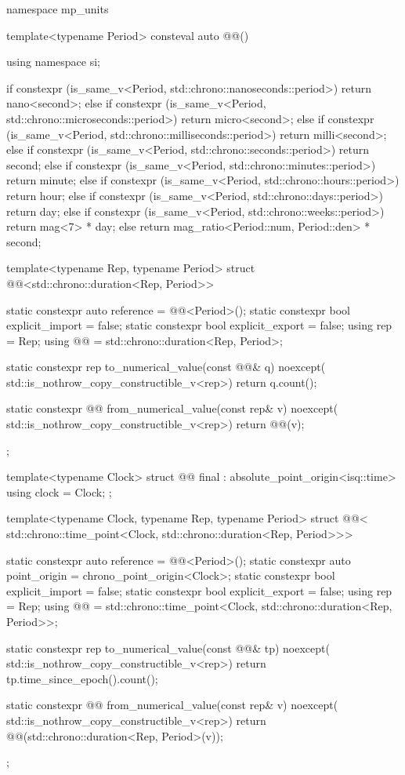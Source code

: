 \begin{codeblock}
namespace mp_units {

template<typename Period>
consteval auto @@()
{
  using namespace si;

  if constexpr (is_same_v<Period, std::chrono::nanoseconds::period>)
    return nano<second>;
  else if constexpr (is_same_v<Period, std::chrono::microseconds::period>)
    return micro<second>;
  else if constexpr (is_same_v<Period, std::chrono::milliseconds::period>)
    return milli<second>;
  else if constexpr (is_same_v<Period, std::chrono::seconds::period>)
    return second;
  else if constexpr (is_same_v<Period, std::chrono::minutes::period>)
    return minute;
  else if constexpr (is_same_v<Period, std::chrono::hours::period>)
    return hour;
  else if constexpr (is_same_v<Period, std::chrono::days::period>)
    return day;
  else if constexpr (is_same_v<Period, std::chrono::weeks::period>)
    return mag<7> * day;
  else
    return mag_ratio<Period::num, Period::den> * second;
}

template<typename Rep, typename Period>
struct @@<std::chrono::duration<Rep, Period>> {
  static constexpr auto reference = @@<Period>();
  static constexpr bool explicit_import = false;
  static constexpr bool explicit_export = false;
  using rep = Rep;
  using @@ = std::chrono::duration<Rep, Period>;

  static constexpr rep to_numerical_value(const @@& q) noexcept(
    std::is_nothrow_copy_constructible_v<rep>)
  {
    return q.count();
  }

  static constexpr @@ from_numerical_value(const rep& v) noexcept(
    std::is_nothrow_copy_constructible_v<rep>)
  {
    return @@(v);
  }
};

template<typename Clock>
struct @@ final : absolute_point_origin<isq::time> {
  using clock = Clock;
};

template<typename Clock, typename Rep, typename Period>
struct @@<
  std::chrono::time_point<Clock, std::chrono::duration<Rep, Period>>> {
  static constexpr auto reference = @@<Period>();
  static constexpr auto point_origin = chrono_point_origin<Clock>;
  static constexpr bool explicit_import = false;
  static constexpr bool explicit_export = false;
  using rep = Rep;
  using @@ = std::chrono::time_point<Clock, std::chrono::duration<Rep, Period>>;

  static constexpr rep to_numerical_value(const @@& tp) noexcept(
    std::is_nothrow_copy_constructible_v<rep>)
  {
    return tp.time_since_epoch().count();
  }

  static constexpr @@ from_numerical_value(const rep& v) noexcept(
    std::is_nothrow_copy_constructible_v<rep>)
  {
    return @@(std::chrono::duration<Rep, Period>(v));
  }
};

}
\end{codeblock}
